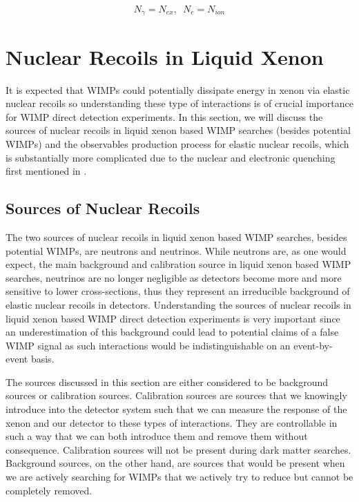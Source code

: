 \begin{equation}
        \label{eqn:er_observables}
        N_{\gamma} = N_{ex}, \, \, \, N_e = N_{ion}
\end{equation}

\section{Nuclear Recoils in Liquid Xenon}
\label{sec:lxe_nr}

It is expected that WIMPs could potentially dissipate energy in xenon via elastic nuclear recoils so understanding these type of interactions is of crucial importance for WIMP direct detection experiments.  In this section, we will discuss the sources of nuclear recoils in liquid xenon based WIMP searches (besides potential WIMPs) and the observables production process for elastic nuclear recoils, which is substantially more complicated due to the nuclear and electronic quenching first mentioned in .



\subsection{Sources of Nuclear Recoils}

The two sources of nuclear recoils in liquid xenon based WIMP searches, besides potential WIMPs, are neutrons and neutrinos.   While neutrons are, as one would expect, the main background and calibration source in liquid xenon based WIMP searches, neutrinos are no longer negligible as detectors become more and more sensitive to lower cross-sections, thus they represent an irreducible background of elastic nuclear recoils in detectors.  Understanding the sources of nuclear recoils in liquid xenon based WIMP direct detection experiments is very important since an underestimation of this background could lead to potential claims of a false WIMP signal as such interactions would be indistinguishable on an event-by-event basis.

The sources discussed in this section are either considered to be background sources or calibration sources.  Calibration sources are sources that we knowingly introduce into the detector system such that we can measure the response of the xenon and our detector to these types of interactions.  They are controllable in such a way that we can both introduce them and remove them without consequence.  Calibration sources will not be present during dark matter searches.  Background sources, on the other hand, are sources that would be present when we are actively searching for WIMPs that we actively try to reduce but cannot be completely removed.

